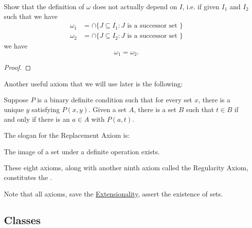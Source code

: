 \documentclass[notoc,notitlepage]{tufte-book}
\begin{document}
\begin{ex}
  Show that the definition of $\omega$ does not actually depend on $I$, i.e. if given $I_1$ and $I_2$ such that we have
  \begin{align*}
    \omega_1 &= \cap \{ J \subseteq I_1 : J \text{ is a successor set } \} \\
    \omega_2 &= \cap \{ J \subseteq I_2 : J \text{ is a successor set } \}
  \end{align*}
  we have
  \begin{equation*}
    \omega_1 = \omega_2.
  \end{equation*}
\end{ex}

\begin{proof}
\end{proof}

Another useful axiom that we will use later is the following:

\begin{axiom}
\label{axiom:replacement_axiom}
  Suppose $P$ is a binary definite condition such that for every set $x$, there is a unique $y$ satisfying $P(x, y)$. Given a set $A$, there is a set $B$ such that $t \in B$ if and only if there is an $a \in A$ with $P(a, t)$.
\end{axiom}

\begin{note}
  The slogan for the Replacement Axiom is:
  \begin{redquote}
    The image of a set under a definite operation exists.
  \end{redquote}
\end{note}

These eight axioms, along with another ninth axiom called the Regularity Axiom, constitutes the .

Note that all axioms, save the \hyperref[axiom:axiom_of_extension]{Extensionality}, assert the existence of sets.


\subsection{Classes}%
\label{sub:classes}
\end{document}
